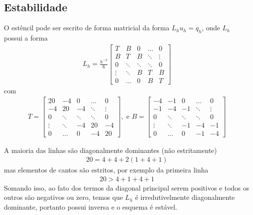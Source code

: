 \documentclass[]{article}
\begin{document}
\subsection{Estabilidade}

O estêncil pode ser escrito de forma matricial da forma $L_h u_h = q_h$, onde $L_h$ possui a forma
\begin{align*}
    L_h = \frac{ h^{-2}   } 6 \left[
        \begin{array}{ccccc}
            T &B& 0 & \dots & 0 \\
            B& T & B & \ddots & \vdots \\
            0& \ddots &\ddots &\ddots& 0\\
            \vdots & \ddots& B & T & B\\
            0 & \dots & 0 & B& T
        \end{array}
    \right]
\end{align*}
com 
\begin{align*}
    T =  \left[
        \begin{array}{ccccc}
            20 &-4& 0 & \dots & 0 \\
            -4& 20 & -4 & \ddots & \vdots \\
            0& \ddots &\ddots &\ddots& 0\\
            \vdots & \ddots& -4 & 20 & -4\\
            0 & \dots & 0 & -4& 20
        \end{array}
    \right], \text{ e }
    B = 
    \left[
        \begin{array}{ccccc}
            -4 &-1& 0 & \dots & 0 \\
            -1& -4 & -1 & \ddots & \vdots \\
            0& \ddots &\ddots &\ddots& 0\\
            \vdots & \ddots& -1 & -4 & -1\\
            0 & \dots & 0 & -1& -4
        \end{array}
    \right]
\end{align*}

A maioria das linhas são diagonalmente dominantes (não estritamente)
\begin{align*}
    20 = 4 +4 + 2(1+4+1)
\end{align*}
mas elementos de cantos são estritos, por exemplo da primeira linha
\begin{align*}
    20 > 4 + 1 + 4 +1
\end{align*}
Somando isso, ao fato dos termos da diagonal principal serem positivos e todos os outros são negativos ou zero, temos que $L_h$ é irredutivelmente diagonalmente dominante, portanto possui inversa e o esquema é estável.
\end{document}
